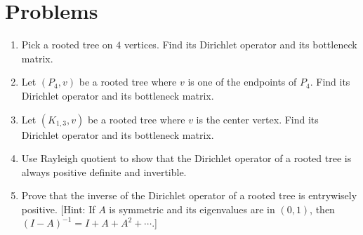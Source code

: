 \documentclass{article}
\theoremstyle{definition}
\begin{document}
\section*{Problems}
\begin{enumerate}
\setlength\itemsep{2em}
\item Pick a rooted tree on $4$ vertices.  Find its Dirichlet operator and its bottleneck matrix. 
\item Let $(P_4,v)$ be a rooted tree where $v$ is one of the endpoints of $P_4$.  Find its Dirichlet operator and its bottleneck matrix. 
\item Let $(K_{1,3},v)$ be a rooted tree where $v$ is the center vertex.  Find its Dirichlet operator and its bottleneck matrix. 
\item Use Rayleigh quotient to show that the Dirichlet operator of a rooted tree is always positive definite and invertible.
\item Prove that the inverse of the Dirichlet operator of a rooted tree is entrywisely positive.  [Hint: If $A$ is symmetric and its eigenvalues are in $(0,1)$, then $(I - A)^{-1} = I + A + A^2 + \cdots$.] 
\end{enumerate}

\end{document}

